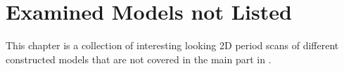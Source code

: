 \chapter{Examined Models not Listed}
\label{chap:app.models}

This chapter is a collection of interesting looking 2D period scans of different constructed models that are not covered in the main part in .




